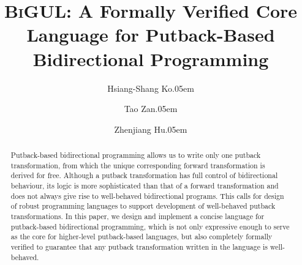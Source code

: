 \documentclass[fleqn]{llncs}
\newcommand{\BiGUL}{\textsc{BiGUL}}
\begin{document}
\title{\BiGUL: A Formally Verified Core Language for Putback-Based Bidirectional Programming}
\author{Hsiang-Shang Ko\kern.05em \and Tao Zan\kern.05em \and Zhenjiang Hu\kern.05em}
\maketitle

\begin{abstract}

Putback-based bidirectional programming allows us to write only one putback 
transformation, from which the unique corresponding forward transformation is derived for free.
Although a putback transformation has full control of bidirectional behaviour, 
its logic is more sophisticated than that of a forward transformation and does not always give rise to well-behaved bidirectional programs. This calls for design of 
robust programming languages to support development of well-behaved 
putback transformations. In this paper, we design and implement
a concise language for putback-based bidirectional programming, 
which is not only expressive enough  
to serve as the core for higher-level putback-based languages,
but also completely formally verified to guarantee that any putback transformation 
written in the language is well-behaved.

%
\end{abstract}
\end{document}
